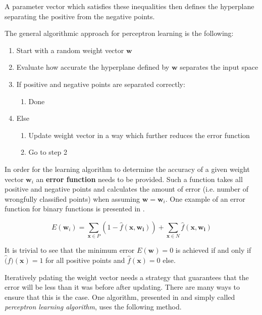 A parameter vector which satisfies these inequalities then defines the hyperplane separating the positive from the negative points.

The general algorithmic approach for perceptron learning is the following:
\begin{enumerate}
    \item Start with a random weight vector $\bm{w}$
    \item Evaluate how accurate the hyperplane defined by $\bm{w}$ separates the input space
    \item If positive and negative points are separated correctly:
    \begin{enumerate}
        \item Done
    \end{enumerate}
    \item Else
    \begin{enumerate}
        \item Update weight vector in a way which further reduces the error function 
        \item Go to step 2
    \end{enumerate}
\end{enumerate}

In order for the learning algorithm to determine the accuracy of a given weight vector $\bm{w}_i$ an \textbf{error function} needs to be provided.
Such a function takes all positive and negative points and calculates the amount of error (i.e. number of wrongfully classified points) when assuming $\bm{w} = \bm{w}_i$.
One example of an error function for binary functions is presented in \cite{rojas_neural_1996}.

\begin{equation}
    \label{eq:error-binary}
    E(\bm{w}_i) = \sum_{\bm{x} \in P} (1 - \hat{f}(\bm{x},\bm{w_i})) + \sum_{\bm{x} \in N} \hat{f}(\bm{x},\bm{w_i})
\end{equation}

It is trivial to see that the minimum error $E(\bm{w}) = 0$ is achieved if and only if $\hat(f)(\bm{x}) = 1$ for all positive points and $\hat{f}(\bm{x}) = 0$ else.

Iteratively pdating the weight vector needs a strategy that guarantees that the error will be less than it was before after updating.
There are many ways to ensure that this is the case.
One algorithm, presented in \cite{rojas_neural_1996} and simply called \textit{perceptron learning algorithm}, uses the following method.

